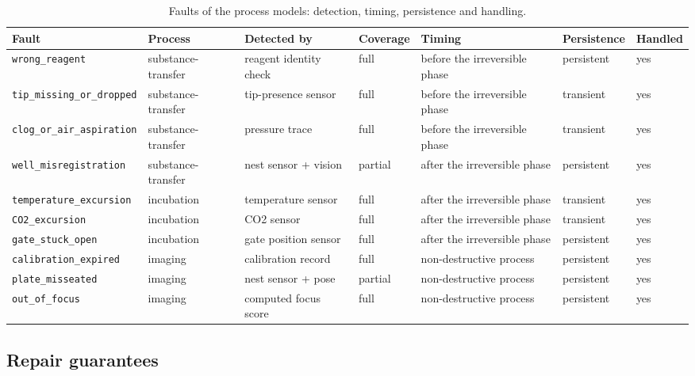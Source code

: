 \documentclass[10pt,a4paper]{article}
\begin{document}
\begin{table}[tbp]\centering\footnotesize
\caption{Faults of the process models: detection, timing, persistence and handling.}\label{tab:trust}
\begin{tabularx}{\linewidth}{p{3.2cm}lXllll}\toprule
\textbf{Fault} & \textbf{Process} & \textbf{Detected by} & \textbf{Coverage} & \textbf{Timing} & \textbf{Persistence} & \textbf{Handled} \\\midrule
\texttt{wrong\_\allowbreak{}reagent} & substance-transfer & reagent identity check & full & before the irreversible phase & persistent & yes \\
\texttt{tip\_\allowbreak{}missing\_\allowbreak{}or\_\allowbreak{}dropped} & substance-transfer & tip-presence sensor & full & before the irreversible phase & transient & yes \\
\texttt{clog\_\allowbreak{}or\_\allowbreak{}air\_\allowbreak{}aspiration} & substance-transfer & pressure trace & full & before the irreversible phase & transient & yes \\
\texttt{well\_\allowbreak{}misregistration} & substance-transfer & nest sensor + vision & partial & after the irreversible phase & persistent & yes \\
\texttt{temperature\_\allowbreak{}excursion} & incubation & temperature sensor & full & after the irreversible phase & transient & yes \\
\texttt{CO2\_\allowbreak{}excursion} & incubation & CO2 sensor & full & after the irreversible phase & transient & yes \\
\texttt{gate\_\allowbreak{}stuck\_\allowbreak{}open} & incubation & gate position sensor & full & after the irreversible phase & persistent & yes \\
\texttt{calibration\_\allowbreak{}expired} & imaging & calibration record & full & non-destructive process & persistent & yes \\
\texttt{plate\_\allowbreak{}misseated} & imaging & nest sensor + pose & partial & non-destructive process & persistent & yes \\
\texttt{out\_\allowbreak{}of\_\allowbreak{}focus} & imaging & computed focus score & full & non-destructive process & persistent & yes \\\bottomrule
\end{tabularx}
\end{table}

\subsection{Repair guarantees}\label{sec:guarantees}
\end{document}
